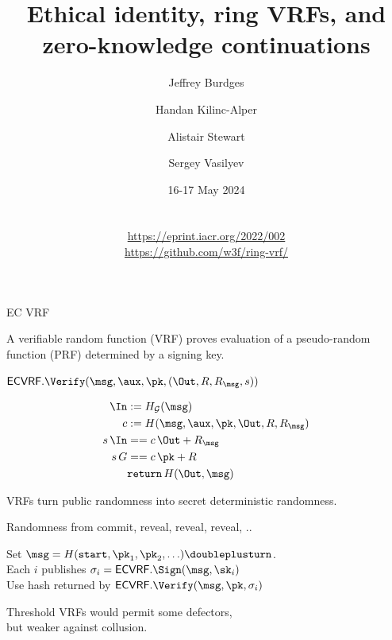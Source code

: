 \documentclass{beamer}
\title{Ethical identity, ring VRFs, and \\ zero-knowledge continuations}
\author{Jeffrey Burdges \and Handan Kilinc-Alper \and Alistair Stewart \and Sergey Vasilyev}
\date{16-17 May 2024 \\ \vphantom{|} \\ \vphantom{|} \\ \url{https://eprint.iacr.org/2022/002} \\ \url{https://github.com/w3f/ring-vrf/}}
\begin{document}
\maketitle






\begin{frame}{EC VRF}

A verifiable random function (VRF) proves evaluation of a pseudo-random function (PRF) determined by a signing key.

\bigskip\bigskip

$\mathsf{ECVRF}.\Verify(\msg,\aux,\pk,(\Out,R,R_\msg,s))$
	
$$ \begin{aligned}
\In &:= H_{\mathcal{G}}(\msg) \\
c &:= H(\msg,\aux,\pk,\Out,R,R_\msg) \\
s \, \In &== c \, \Out + R_\msg \\
s \, G &== c \, \pk + R \\
& \mathtt{return}\, H(\Out,\msg) \\
\end{aligned} $$
	
\end{frame}



\begin{frame}

VRFs turn public randomness into secret deterministic randomness.

\bigskip\bigskip

Randomness from commit, reveal, reveal, reveal, .. \\ \medskip

Set $\msg = H(\mathtt{start},\pk_1,\pk_2,\ldots) \doubleplus \mathtt{turn}$.  \\
Each $i$ publishes $\sigma_i = \mathsf{ECVRF}.\Sign(\msg,\sk_i)$ \\
Use hash returned by $\mathsf{ECVRF}.\Verify(\msg,\pk,\sigma_i)$ \\

\bigskip\bigskip

Threshold VRFs would permit some defectors, \\
\hspace{10pt}   but weaker against collusion.

\end{frame}
\end{document}
